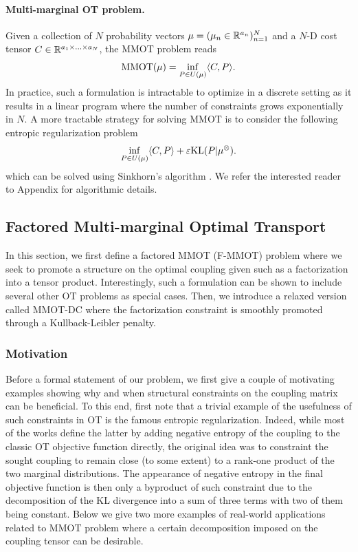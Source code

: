 \paragraph{Multi-marginal OT problem.} Given a collection of $N$ probability vectors $\mu = (\mu_n \in \mathbb R^{a_n})_{n=1}^N$
and a $N$-D cost tensor $C \in \mathbb R^{a_1 \times ... \times a_N}$, the MMOT problem reads
\begin{equation*}
  \text{MMOT}(\mu) = \inf_{P \in U(\mu)} \langle C, P \rangle.
\end{equation*}
In practice, such a formulation is intractable to optimize in a discrete setting as it results in a linear program where the number
of constraints grows exponentially in $N$. A more tractable strategy for solving MMOT is to consider the following entropic
regularization problem
\begin{equation} \label{MMOT_primal}
  \inf_{P \in U(\mu)} \langle C, P \rangle + \varepsilon \text{KL}(P | \mu^{\otimes}).
\end{equation}
which can be solved using Sinkhorn's algorithm \citep{Benamou14}.
We refer the interested reader to Appendix for algorithmic details.

\subsection{Factored Multi-marginal Optimal Transport}

In this section, we first define a factored MMOT (F-MMOT) problem where we seek to promote a structure on the optimal coupling
given such as a factorization into a tensor product. Interestingly, such a formulation can be shown to include several other
OT problems as special cases. Then, we introduce a relaxed version called MMOT-DC where the factorization constraint is
smoothly promoted through a Kullback-Leibler penalty.

\subsubsection{Motivation}

Before a formal statement of our problem, we first give a couple of motivating examples showing why and when structural constraints on the coupling matrix can be beneficial. To this end, first note that a trivial example of the usefulness of such constraints in OT is the famous entropic regularization. Indeed, while most of the works define the latter by adding negative entropy of the coupling to the classic OT objective function directly, the original idea was to constraint the sought coupling to remain close (to some extent) to a rank-one product of the two marginal distributions. The appearance of negative entropy in the final objective function is then only a byproduct of such constraint due to the decomposition of the KL divergence into a sum of three terms with two of them being constant. Below we give two more examples of real-world applications related to MMOT problem where a certain decomposition imposed on the coupling tensor can be desirable.
